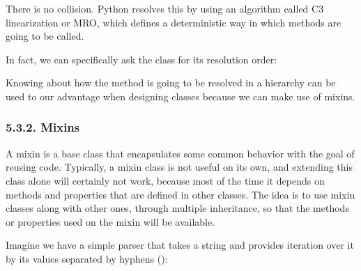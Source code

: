 \documentclass[a4paper,10pt,english]{sphinxmanual}
\begin{document}
There is no collision. Python resolves this by using an algorithm called C3 linearization or MRO, which
defines a deterministic way in which methods are going to be called.

In fact, we can specifically ask the class for its resolution order:

\begin{sphinxVerbatim}[commandchars=\\\{\}]
\PYG{p}{[}    \PYG{p}{]}
\end{sphinxVerbatim}

Knowing about how the method is going to be resolved in a hierarchy can be used to our advantage when
designing classes because we can make use of mixins.


\subsubsection{5.3.2. Mixins}
\label{\detokenize{chapters/3_general_traits/index:mixins}}
A mixin is a base class that encapsulates some common behavior with the goal of reusing code. Typically, a
mixin class is not useful on its own, and extending this class alone will certainly not work, because most of
the time it depends on methods and properties that are defined in other classes. The idea is to use mixin
classes along with other ones, through multiple inheritance, so that the methods or properties used on the
mixin will be available.

Imagine we have a simple parser that takes a string and provides iteration over it by its values separated by
hyphens (\sphinxhyphen{}):

\begin{sphinxVerbatim}[commandchars=\\\{\}]
 
      
          
     
     
\end{sphinxVerbatim}
\end{document}
